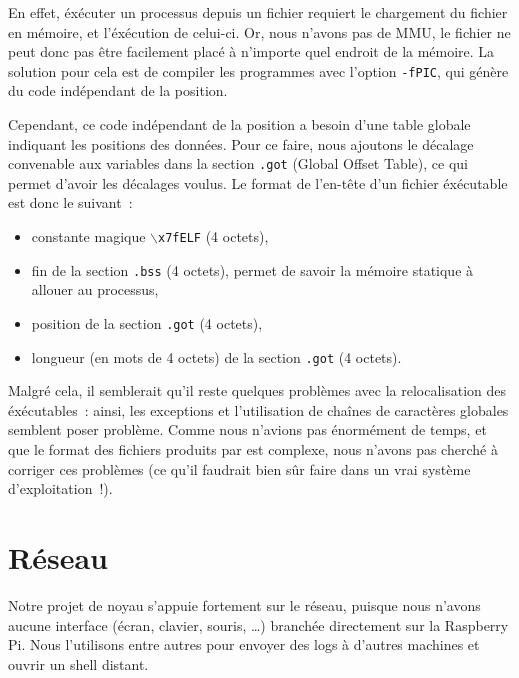 \documentclass[11pt,a4paper]{article}
\begin{document}
En effet, éxécuter un processus depuis un fichier requiert le
chargement du fichier en mémoire, et l'éxécution de celui-ci. Or, nous
n'avons pas de MMU, le fichier ne peut donc pas être facilement placé
à n'importe quel endroit de la mémoire. La solution pour cela est de
compiler les programmes avec l'option \texttt{-fPIC}, qui génère du
code indépendant de la position.

Cependant, ce code indépendant de la position a besoin d'une table
globale indiquant les positions des données. Pour ce faire, nous
ajoutons le décalage convenable aux variables dans la section
\texttt{.got} (Global Offset Table), ce qui permet d'avoir les
décalages voulus. Le format de l'en-tête d'un fichier éxécutable est
donc le suivant~:
\begin{itemize}
\item{constante magique \texttt{$\backslash{}$x7fELF} (4 octets),}
\item{fin de la section \texttt{.bss} (4 octets), permet de savoir la
  mémoire statique à allouer au processus,}
\item{position de la section \texttt{.got} (4 octets),}
\item{longueur (en mots de 4 octets) de la section \texttt{.got} (4 octets).\\}
\end{itemize}

Malgré cela, il semblerait qu'il reste quelques problèmes avec la
relocalisation des éxécutables~: ainsi, les exceptions et
l'utilisation de chaînes de caractères globales semblent poser
problème. Comme nous n'avions pas énormément de temps, et que le
format des fichiers produits par  est complexe, nous
n'avons pas cherché à corriger ces problèmes (ce qu'il faudrait bien
sûr faire dans un vrai système d'exploitation~!).

\section{Réseau}
Notre projet de noyau s'appuie fortement sur le réseau, puisque nous n'avons
aucune interface (écran, clavier, souris, \ldots) branchée directement sur la
Raspberry Pi. Nous l'utilisons entre autres pour envoyer des logs
à d'autres machines et ouvrir un shell distant.
\end{document}
